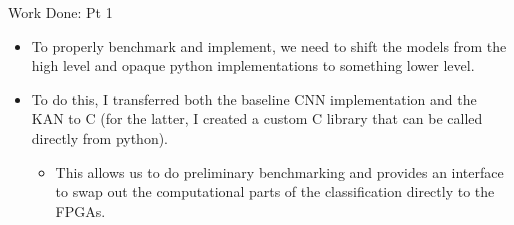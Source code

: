 \documentclass[aspectratio=169,xcolor=dvipsnames]{beamer}
\begin{document}
\begin{frame}{Work Done: Pt 1}
  \begin{itemize}
    \item To properly benchmark and implement, we need to shift the models from the high level and opaque python implementations to something lower level.
    \item To do this, I transferred both the baseline CNN implementation and the KAN to C (for the latter, I created a custom C library that can be called directly from python).
          \begin{itemize}
            \item This allows us to do preliminary benchmarking and provides an interface to swap out the computational parts of the classification directly to the FPGAs.
          \end{itemize}

  \end{itemize}
\end{frame}
\end{document}
